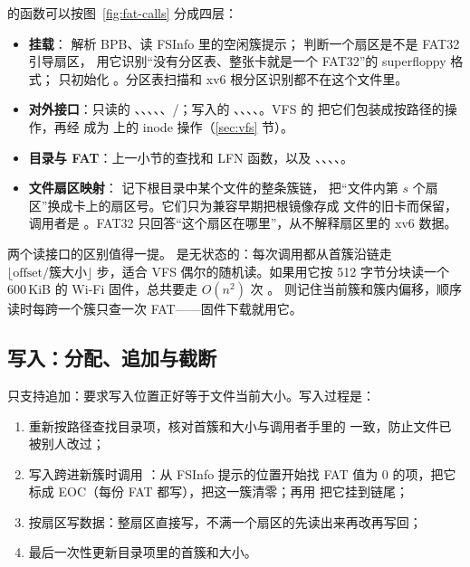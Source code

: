  的函数可以按图~\ref{fig:fat-calls} 分成四层：

\begin{itemize}
  \item \textbf{挂载}： 解析 BPB、读 FSInfo 里的空闲簇提示； 判断一个扇区是不是 FAT32 引导扇区， 用它识别“没有分区表、整张卡就是一个 FAT32”的 superfloppy 格式； 只初始化 。分区表扫描和 xv6 根分区识别都不在这个文件里。
  \item \textbf{对外接口}：只读的 、、、、、/；写入的 、、、、。VFS 的  把它们包装成按路径的操作，再经  成为  上的 inode 操作（\ref{sec:vfs} 节）。
  \item \textbf{目录与 FAT}：上一小节的查找和 LFN 函数，以及 、、、、。
  \item \textbf{文件扇区映射}： 记下根目录中某个文件的整条簇链， 把“文件内第 $s$ 个扇区”换成卡上的扇区号。它们只为兼容早期把根镜像存成  文件的旧卡而保留，调用者是 。FAT32 只回答“这个扇区在哪里”，从不解释扇区里的 xv6 数据。
\end{itemize}

两个读接口的区别值得一提。 是无状态的：每次调用都从首簇沿链走 $\lfloor\text{offset}/\text{簇大小}\rfloor$ 步，适合 VFS 偶尔的随机读。如果用它按 512 字节分块读一个 600\,KiB 的 Wi-Fi 固件，总共要走 $O(n^2)$ 次 。 则记住当前簇和簇内偏移，顺序读时每跨一个簇只查一次 FAT——固件下载就用它。

\subsection{写入：分配、追加与截断}

 只支持追加：要求写入位置正好等于文件当前大小。写入过程是：

\begin{enumerate}
  \item 重新按路径查找目录项，核对首簇和大小与调用者手里的  一致，防止文件已被别人改过；
  \item 写入跨进新簇时调用 ：从 FSInfo 提示的位置开始找 FAT 值为 0 的项，把它标成 EOC（每份 FAT 都写），把这一簇清零；再用  把它挂到链尾；
  \item 按扇区写数据：整扇区直接写，不满一个扇区的先读出来再改再写回；
  \item 最后一次性更新目录项里的首簇和大小。
\end{enumerate}

